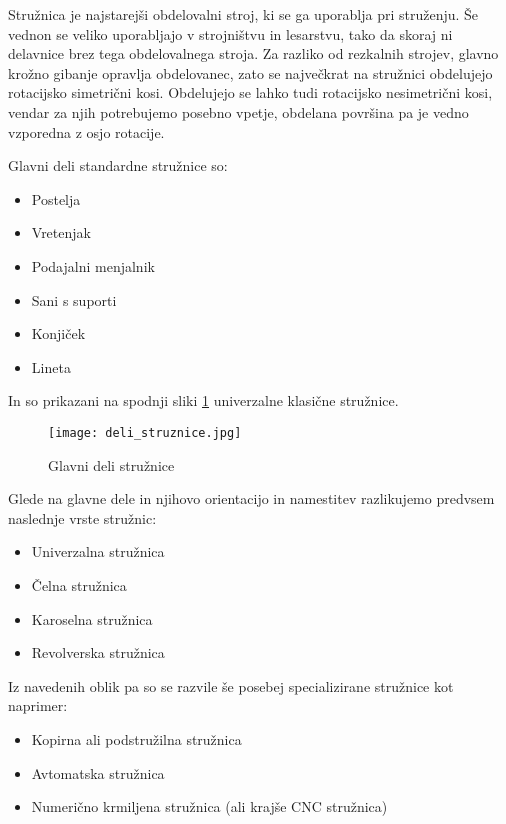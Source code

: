 Stružnica je najstarejši obdelovalni stroj,
ki se ga uporablja pri struženju. Še vednon se
veliko uporabljajo v strojništvu in lesarstvu,
tako da skoraj ni delavnice brez tega obdelovalnega stroja.
Za razliko od rezkalnih strojev, glavno krožno gibanje opravlja
obdelovanec, zato se največkrat na stružnici obdelujejo rotacijsko
simetrični kosi. Obdelujejo se lahko tudi rotacijsko nesimetrični kosi,
vendar za njih potrebujemo posebno vpetje, obdelana površina pa je
vedno vzporedna z osjo rotacije.

\noindent Glavni deli standardne stružnice so:
\begin{itemize}
	\item Postelja
	\item Vretenjak
	\item Podajalni menjalnik
	\item Sani s suporti
	\item Konjiček
	\item Lineta
\end{itemize}

In so prikazani na spodnji sliki \ref{img:deli_struznice} univerzalne klasične stružnice.
\begin{figure}[H]
	\begin{center}
		\texttt{[image: deli\_struznice.jpg]}
		\caption{Glavni deli stružnice
			\cite{deli_struznice}}
		\label{img:deli_struznice}
	\end{center}
\end{figure}

\noindent Glede na glavne dele in njihovo orientacijo in namestitev razlikujemo
predvsem naslednje vrste stružnic:
\begin{itemize}
	\item Univerzalna stružnica
	\item Čelna stružnica
	\item Karoselna stružnica
	\item Revolverska stružnica
\end{itemize}

\noindent Iz navedenih oblik pa so se razvile še posebej specializirane
stružnice kot naprimer:
\begin{itemize}
	\item Kopirna ali podstružilna stružnica
	\item Avtomatska stružnica
	\item Numerično krmiljena stružnica (ali krajše CNC stružnica)
\end{itemize}